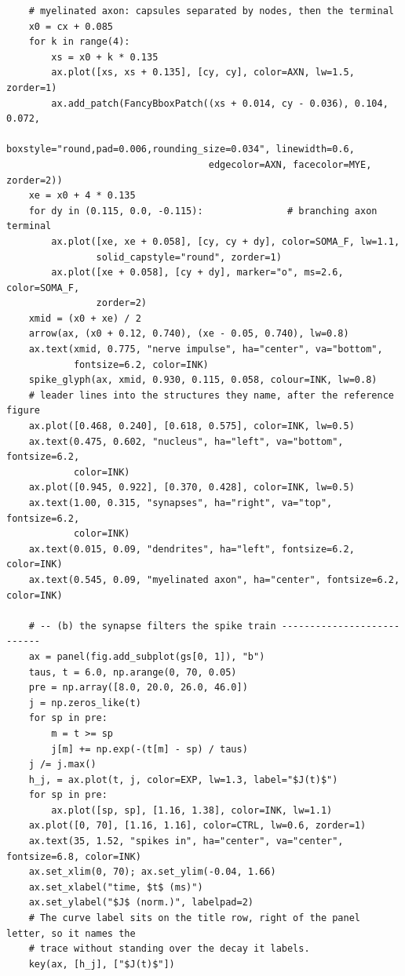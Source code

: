 \documentclass[a4paper,10pt]{article}
\begin{document}
\begin{Verbatim}
    # myelinated axon: capsules separated by nodes, then the terminal
    x0 = cx + 0.085
    for k in range(4):
        xs = x0 + k * 0.135
        ax.plot([xs, xs + 0.135], [cy, cy], color=AXN, lw=1.5, zorder=1)
        ax.add_patch(FancyBboxPatch((xs + 0.014, cy - 0.036), 0.104, 0.072,
                                    boxstyle="round,pad=0.006,rounding_size=0.034", linewidth=0.6,
                                    edgecolor=AXN, facecolor=MYE, zorder=2))
    xe = x0 + 4 * 0.135
    for dy in (0.115, 0.0, -0.115):               # branching axon terminal
        ax.plot([xe, xe + 0.058], [cy, cy + dy], color=SOMA_F, lw=1.1,
                solid_capstyle="round", zorder=1)
        ax.plot([xe + 0.058], [cy + dy], marker="o", ms=2.6, color=SOMA_F,
                zorder=2)
    xmid = (x0 + xe) / 2
    arrow(ax, (x0 + 0.12, 0.740), (xe - 0.05, 0.740), lw=0.8)
    ax.text(xmid, 0.775, "nerve impulse", ha="center", va="bottom",
            fontsize=6.2, color=INK)
    spike_glyph(ax, xmid, 0.930, 0.115, 0.058, colour=INK, lw=0.8)
    # leader lines into the structures they name, after the reference figure
    ax.plot([0.468, 0.240], [0.618, 0.575], color=INK, lw=0.5)
    ax.text(0.475, 0.602, "nucleus", ha="left", va="bottom", fontsize=6.2,
            color=INK)
    ax.plot([0.945, 0.922], [0.370, 0.428], color=INK, lw=0.5)
    ax.text(1.00, 0.315, "synapses", ha="right", va="top", fontsize=6.2,
            color=INK)
    ax.text(0.015, 0.09, "dendrites", ha="left", fontsize=6.2, color=INK)
    ax.text(0.545, 0.09, "myelinated axon", ha="center", fontsize=6.2, color=INK)

    # -- (b) the synapse filters the spike train ---------------------------
    ax = panel(fig.add_subplot(gs[0, 1]), "b")
    taus, t = 6.0, np.arange(0, 70, 0.05)
    pre = np.array([8.0, 20.0, 26.0, 46.0])
    j = np.zeros_like(t)
    for sp in pre:
        m = t >= sp
        j[m] += np.exp(-(t[m] - sp) / taus)
    j /= j.max()
    h_j, = ax.plot(t, j, color=EXP, lw=1.3, label="$J(t)$")
    for sp in pre:
        ax.plot([sp, sp], [1.16, 1.38], color=INK, lw=1.1)
    ax.plot([0, 70], [1.16, 1.16], color=CTRL, lw=0.6, zorder=1)
    ax.text(35, 1.52, "spikes in", ha="center", va="center", fontsize=6.8, color=INK)
    ax.set_xlim(0, 70); ax.set_ylim(-0.04, 1.66)
    ax.set_xlabel("time, $t$ (ms)")
    ax.set_ylabel("$J$ (norm.)", labelpad=2)
    # The curve label sits on the title row, right of the panel letter, so it names the
    # trace without standing over the decay it labels.
    key(ax, [h_j], ["$J(t)$"])


\end{Verbatim}
\end{document}
